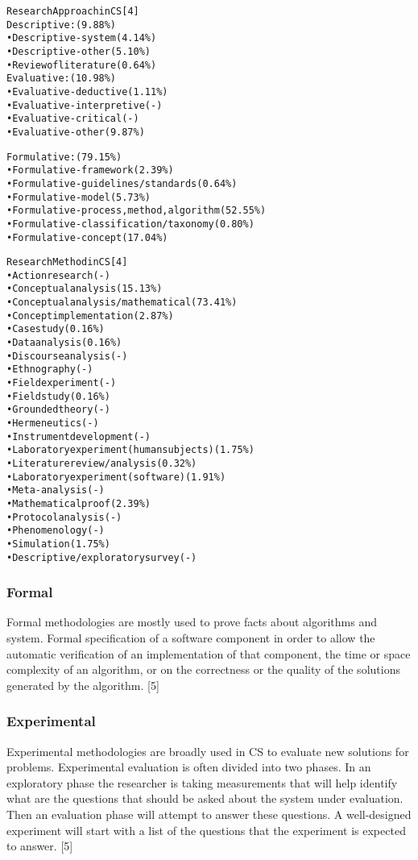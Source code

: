 \begin{alltt}
  Research Approach in CS [4]
  Descriptive: (9.88\%)
  •	Descriptive-system (4.14\%)
  •	Descriptive-other (5.10\%)
  •	Review of literature (0.64\%)
  Evaluative: (10.98\%)
  •	Evaluative-deductive (1.11\%)
  •	Evaluative-interpretive (-)
  •	Evaluative-critical (-)
  •	Evaluative-other (9.87\%)

  Formulative: (79.15\%)
  •	Formulative-framework (2.39\%)
  •	Formulative-guidelines/standards (0.64\%)
  •	Formulative-model (5.73\%)
  •	Formulative-process, method, algorithm (52.55\%)
  •	Formulative-classification/taxonomy (0.80\%)
  •	Formulative-concept (17.04\%)

   Research Method in CS [4]
  •	Action research (-)
  •	Conceptual analysis (15.13\%)
  •	Conceptual analysis/mathematical (73.41\%)
  •	Concept implementation (2.87\%)
  •	Case study (0.16\%)
  •	Data analysis (0.16\%)
  •	Discourse analysis (-)
  •	Ethnography (-)
  •	Field experiment (-)
  •	Field study (0.16\%)
  •	Grounded theory (-)
  •	Hermeneutics (-)
  •	Instrument development (-)
  •	Laboratory experiment (human subjects) (1.75\%)
  •	Literature review / analysis (0.32\%)
  •	Laboratory experiment (software) (1.91\%)
  •	Meta-analysis (-)
  •	Mathematical proof (2.39\%)
  •	Protocol analysis (-)
  •	Phenomenology (-)
  •	Simulation (1.75\%)
  •	Descriptive/exploratory survey (-)
\end{alltt}

\subsubsection*{Formal}

Formal methodologies are mostly used to prove facts about algorithms and system. Formal specification of a software component in order to allow the automatic verification of an implementation of that component, the time or space complexity of an algorithm, or on the correctness or the quality of the solutions generated by the algorithm. [5]

\subsubsection*{Experimental}

Experimental methodologies are broadly used in CS to evaluate new solutions for problems. Experimental evaluation is often divided into two phases. In an exploratory phase the researcher is taking measurements that will help identify what are the questions that should be asked about the system under evaluation. Then an evaluation phase will attempt to answer these questions. A well-designed experiment will start with a list of the questions that the experiment is expected to answer. [5]


